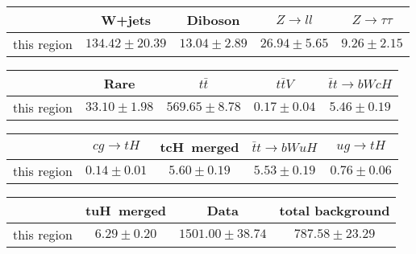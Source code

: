 \centering
\begin{tabular}{|c|c|c|c|c|} \hline
 & W+jets & Diboson & $Z\to ll$ & $Z\to \tau\tau$\\\hline
this region & $134.42\pm20.39$ & $13.04\pm2.89$ & $26.94\pm5.65$ & $9.26\pm2.15$\\\hline
\end{tabular}
\begin{tabular}{|c|c|c|c|c|} \hline
 & Rare & $t\bar{t}$ & $t\bar{t}V$ & $\bar{t}t\to bWcH$\\\hline
this region & $33.10\pm1.98$ & $569.65\pm8.78$ & $0.17\pm0.04$ & $5.46\pm0.19$\\\hline
\end{tabular}
\begin{tabular}{|c|c|c|c|c|} \hline
 & $cg\to tH$ & tcH~merged & $\bar{t}t\to bWuH$ & $ug\to tH$\\\hline
this region & $0.14\pm0.01$ & $5.60\pm0.19$ & $5.53\pm0.19$ & $0.76\pm0.06$\\\hline
\end{tabular}
\begin{tabular}{|c|c|c|c|} \hline
 & tuH~merged & Data & total background\\\hline
this region & $6.29\pm0.20$ & $1501.00\pm38.74$ & $787.58\pm23.29$\\\hline
\end{tabular}
